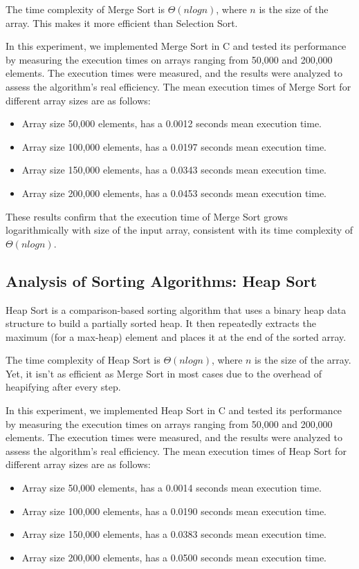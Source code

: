 \documentclass[conference]{IEEEtran}
\begin{document}
The time complexity of Merge Sort is $\Theta(nlogn)$, where $n$ is the size of the array. This makes it more efficient than Selection Sort. 

In this experiment, we implemented Merge Sort in C and tested its performance by measuring the execution times on arrays ranging from 50,000 and 200,000 elements. The execution times were measured, and the results were analyzed to assess the algorithm's real efficiency. The mean execution times of Merge Sort for different array sizes are as follows:
\begin{itemize}
    \item Array size 50,000 elements, has a 0.0012 seconds mean execution time.
    \item Array size 100,000 elements, has a 0.0197 seconds mean execution time.
    \item Array size 150,000 elements, has a 0.0343 seconds mean execution time.
    \item Array size 200,000 elements, has a 0.0453 seconds mean execution time.
\end{itemize}

These results confirm that the execution time of Merge Sort grows logarithmically with size of the input array, consistent with its time complexity of $\Theta(nlogn)$. 

\subsection{Analysis of Sorting Algorithms: Heap Sort}
Heap Sort is a comparison-based sorting algorithm that uses a binary heap data structure to build a partially sorted heap. It then repeatedly extracts the maximum (for a max-heap) element and places it at the end of the sorted array.

The time complexity of Heap Sort is $\Theta(nlogn)$, where $n$ is the size of the array. Yet, it isn't as efficient as Merge Sort in most cases due to the overhead of heapifying after every step. 

In this experiment, we implemented Heap Sort in C and tested its performance by measuring the execution times on arrays ranging from 50,000 and 200,000 elements. The execution times were measured, and the results were analyzed to assess the algorithm's real efficiency. The mean execution times of Heap Sort for different array sizes are as follows:
\begin{itemize}
    \item Array size 50,000 elements, has a 0.0014 seconds mean execution time.
    \item Array size 100,000 elements, has a 0.0190 seconds mean execution time.
    \item Array size 150,000 elements, has a 0.0383 seconds mean execution time.
    \item Array size 200,000 elements, has a 0.0500 seconds mean execution time.
\end{itemize}
\end{document}

